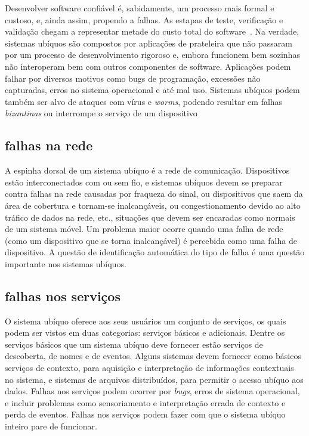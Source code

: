 Desenvolver software confiável é, sabidamente, um processo mais formal e custoso, e, ainda assim, propendo a falhas. As estapas de teste, verificação e validação chegam a representar metade do custo total do software~\cite{hailpern2002software}. Na verdade, sistemas ubíquos são compostos por aplicações de prateleira que não passaram por um processo de desenvolvimento rigoroso e, embora funcionem bem sozinhas não interoperam bem com outros componentes de software. Aplicações podem falhar por diversos motivos como bugs de programação, excessões não capturadas, erros no sistema operacional e até mal uso. Sistemas ubíquos podem também ser alvo de ataques com vírus e \emph{worms}, podendo resultar em falhas \emph{bizantinas} ou interrompe o serviço de um dispositivo


\subsection{falhas na rede} %
\label{sub:falhas_na_rede}

A espinha dorsal de um sistema ubíquo é a rede de comunicação. Dispositivos estão interconectados com ou sem fio, e sistemas ubíquos devem se preparar contra falhas na rede causadas por fraqueza do sinal, ou dispositivos que saem da área de cobertura e tornam-se inalcançáveis, ou congestionamento devido ao alto tráfico de dados na rede, etc., situações que devem ser encaradas como normais de um sistema móvel. Um problema maior ocorre quando uma falha de rede (como um dispositivo que se torna inalcançável) é percebida como uma falha de dispositivo. A questão de identificação automática do tipo de falha é uma questão importante nos sistemas ubíquos.


\subsection{falhas nos serviços} %
\label{sub:falhas_nos_servicos}
O sistema ubíquo oferece aos seus usuários um conjunto de serviços, os quais podem ser vistos em duas categorias: serviços básicos e adicionais. Dentre os serviços básicos que um sistema ubíquo deve fornecer estão serviços de descoberta, de nomes e de eventos. Alguns sistemas devem fornecer como básicos serviços de contexto, para aquisição e interpretação de informações contextuais no sistema, e sistemas de arquivos distribuídos, para permitir o acesso ubíquo aos dados. Falhas nos serviços podem ocorrer por \emph{bugs}, erros de sistema operacional, e incluir problemas como sensoriamento e interpretação errada de contexto e perda de eventos. Falhas nos serviços podem fazer com que o sistema ubíquo inteiro pare de funcionar.

